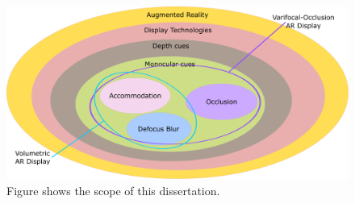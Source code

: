 \begin{figure}[h!]
\centering
\includegraphics[width=\columnwidth]{images/other/scope}
\caption[Scope of this dissertation]{Figure shows the scope of this dissertation.}
\label{fig:scope}
\end{figure}

